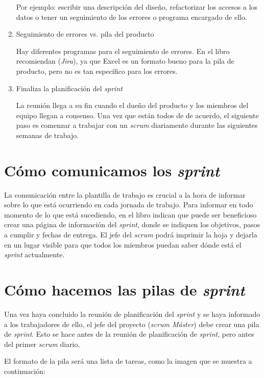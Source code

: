 \begin{enumerate}
 	Por ejemplo: escribir una descripción del diseño, refactorizar los accesos a los datos o tener un seguimiento de los errores o programa encargado de ello.
	
	\item Seguimiento de errores vs. pila del producto
	
	Hay diferentes programas para el seguimiento de errores. En el libro recomiendan (\textit{Jira}), ya que Excel es un formato bueno para la pila de producto, pero no es tan específico para los errores.
	
	\item Finaliza la planificación del \textit{sprint}
	
	La reunión llega a su fin cuando el dueño del producto y los miembros del equipo llegan a consenso. Una vez que están todos de de acuerdo, el siguiente paso es comenzar a trabajar con un \textit{scrum} diariamente durante las siguientes semanas de trabajo.
\end{enumerate}

\section{Cómo comunicamos los \textit{sprint}}

La comunicación entre la plantilla de trabajo es crucial a la hora de informar sobre lo que está ocurriendo en cada jornada de trabajo. Para informar en todo momento de lo que está sucediendo, en el libro indican que puede ser beneficioso crear una página de información del \textit{sprint}, donde se indiquen los objetivos, pasos a cumplir y fechas de entrega. El jefe del \textit{scrum} podrá imprimir la hoja y dejarla en un lugar visible para que todos los
miembros puedan saber dónde está el \textit{sprint} actualmente.

\section{Cómo hacemos las pilas de \textit{sprint}}

Una vez haya concluido la reunión de planificación del \textit{sprint} y se haya informado a los trabajadores de ello, el jefe del proyecto (\textit{scrum Máster}) debe crear una pila de \textit{sprint}. Esto se hace antes de la reunión de planificación de \textit{sprint}, pero antes del primer \textit{scrum} diario.

El formato de la pila será una lista de tareas, como la imagen que se muestra
a continuación:

